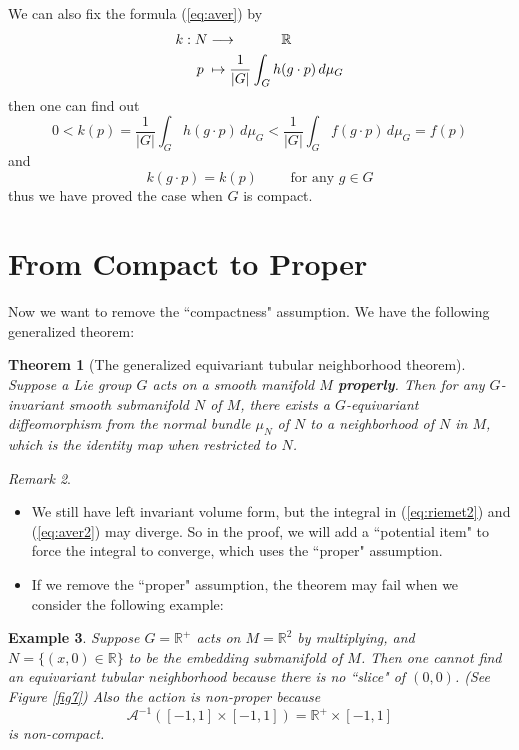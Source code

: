 \documentclass[reqno,11pt]{amsart}
\numberwithin{equation}{section}
\theoremstyle{plain}
\newtheorem{theorem}{Theorem}[section]
\newtheorem{eg}[theorem]{Example}
\theoremstyle{plain}
\numberwithin{equation}{section}
\theoremstyle{remark}
\newtheorem{remark}[theorem]{Remark}
\begin{document}
We can also fix the formula (\ref{eq:aver}) by
\begin{equation}
\begin{aligned}
k:N&\longrightarrow\hspace{1.1cm} \mathbb{R}\\
p\;&\mapsto \frac{1}{|G|}\int_G h(g \cdot p)\,d\mu_G
\label{eq:aver2}
\end{aligned}
\end{equation}
then one can find out
$$0<k(p)=\frac{1}{|G|}\int_G h(g \cdot p)\,d\mu_G<\frac{1}{|G|}\int_G f(g \cdot p)\,d\mu_G=f(p)$$
and $$k(g\cdot p)=k(p)\qquad \text{ for any }g \in G$$
thus we have proved the case when $G$ is compact.

\section{From Compact to Proper} 
Now we want to remove the ``compactness" assumption. We have the following generalized theorem:
\begin{theorem}[The generalized equivariant tubular neighborhood theorem]
	\label{thm:equi2}
	Suppose a Lie group $G$
	acts on a smooth manifold $M$ \textbf{properly}. Then for any $G$-invariant smooth submanifold $N$
	of $M$, there exists a $G$-equivariant diffeomorphism from the normal bundle $\mu_N$ of $N$ to a
	neighborhood of $N$ in $M$, which is the identity map when restricted to $N$.
\end{theorem}
\begin{remark}\
\begin{itemize}
	\item We still have left invariant volume form, but the integral in (\ref{eq:riemet2}) and (\ref{eq:aver2}) may diverge. So in the proof, we will add a ``potential item" to force the integral to converge, which uses the ``proper" assumption.
	\item If we remove the ``proper" assumption, the theorem may fail when we consider the following example:
\end{itemize}
\end{remark}
\begin{eg}
	Suppose $G=\mathbb{R}^+$ acts on $M=\mathbb{R}^2$ by multiplying, and $N=\{(x,0) \in \mathbb{R}\}$ to be the embedding submanifold of $M$. Then one cannot find an equivariant tubular neighborhood because there is no ``slice" of $(0,0)$. (See Figure \ref{fig7}) Also the action is non-proper because
	$$\mathcal{A}^{-1}([-1,1] \times [-1,1])=\mathbb{R}^+ \times [-1,1]$$
	is  non-compact.
\end{eg}
\end{document}
